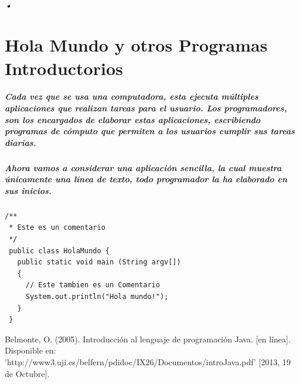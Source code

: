 \documentclass[12pt]{book} %
\begin{document}
\paragraph{•}

\chapter{Hola Mundo y otros Programas Introductorios}

\paragraph{Cada vez que se usa una computadora, esta ejecuta múltiples aplicaciones que realizan tareas para el usuario. Los programadores, son los encargados de elaborar estas aplicaciones, escribiendo programas de cómputo que permiten a los usuarios cumplir sus tareas diarias.}
\paragraph{Ahora vamos a considerar una aplicación sencilla, la cual muestra únicamente una línea de texto, todo programador la ha elaborado en sus inicios.}
\noindent
\noindent
%
\begin{lstlisting}[frame=single]
/**
 * Este es un comentario
 */
 public class HolaMundo {
   public static void main (String argv[])
   {
     // Este tambien es un Comentario
     System.out.println("Hola mundo!");
   }
 }
\end{lstlisting}

\begin{thebibliography}{99}
 Belmonte, O. (2005). Introducción al lenguaje de programación Java. [en línea]. Disponible en: 'http://www3.uji.es/belfern/pdidoc/IX26/Documentos/introJava.pdf' [2013, 19 de Octubre].
\end{thebibliography}
\end{document}
